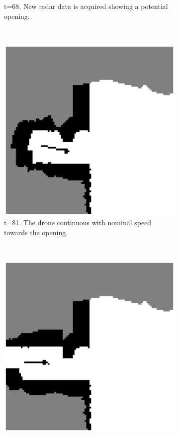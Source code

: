 \begin{figure}
\begin{subfigure}[t]{0.3\textwidth}
\caption{t=68. New radar data is acquired showing a potential opening. }
\label{fig:sim_t68}
\end{subfigure}\\
\begin{subfigure}[t]{0.3\textwidth}
\includegraphics[width=\textwidth]{Figures/Simulation/t81_nominal.eps}
\caption{t=81. The drone continuous with nominal speed towards the opening.}
\label{fig:sim_t81}
\end{subfigure}
\,
\begin{subfigure}[t]{0.3\textwidth}
\includegraphics[width=\textwidth]{Figures/Simulation/t95_home_free.eps}

\end{subfigure}
\end{figure}
